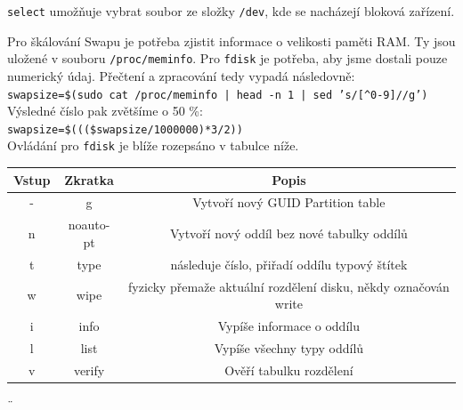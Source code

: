 \documentclass[12pt,a4paper,twoside,]{article}
\begin{document}
\texttt{select} umožňuje vybrat soubor ze složky \texttt{/dev}, kde se nacházejí bloková zařízení.
\newpage
{Pro škálování Swapu je potřeba zjistit informace o velikosti paměti RAM. Ty jsou uložené v souboru \texttt{/proc/meminfo}. Pro \texttt{fdisk} je potřeba, aby jsme dostali pouze numerický údaj. Přečtení a zpracování tedy vypadá následovně:\\
	
\texttt{swapsize=\$(sudo cat /proc/meminfo | head -n 1 | sed 's/[\^{}0-9]//g')}\\

\hspace*{-1.5em}Výsledné číslo pak zvětšíme o 50 \%:\\ 

\texttt{swapsize=\$(((\$swapsize/1000000)*3/2))}\\

\hspace{-1.5em}Ovládání pro \texttt{fdisk} je blíže rozepsáno v tabulce níže.
\begin{table}[h]
	\begin{tabular}{|c|c|c|}\hline
		Vstup & Zkratka & Popis \\ \hline
		-&g&Vytvoří nový GUID Partition table \\ \hline
		n&noauto-pt&Vytvoří nový oddíl bez nové tabulky oddílů \\ \hline
		t&type&následuje číslo, přiřadí oddílu typový štítek \\ \hline
		w&wipe&fyzicky přemaže aktuální rozdělení disku, někdy označován write \\ \hline
		i&info&Vypíše informace o oddílu \\ \hline
		l&list&Vypíše všechny typy oddílů \\ \hline
		v&verify&Ověří tabulku rozdělení \\ \hline
	\end{tabular}
\end{table}




¨
}
\end{document}
